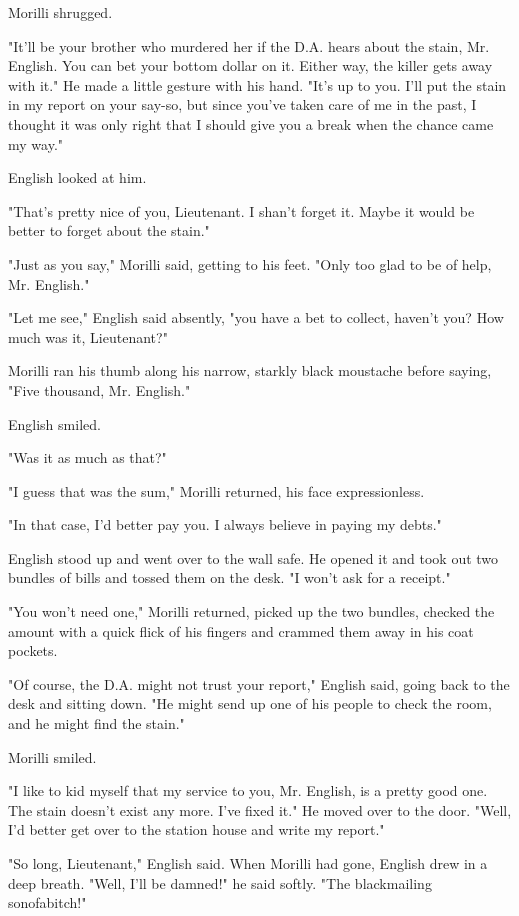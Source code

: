 \documentclass{novel}
\begin{document}
Morilli shrugged.

"It'll be your brother who murdered her if the D.A. hears about the stain, Mr. English. You can bet your bottom dollar on it. Either way, the killer gets away with it." He made a little gesture with his hand. "It's up to you. I'll put the stain in my report on your say-so, but since you've taken care of me in the past, I thought it was only right that I should give you a break when the chance came my way."

English looked at him.

"That's pretty nice of you, Lieutenant. I shan't forget it. Maybe it would be better to forget about the stain."

"Just as you say," Morilli said, getting to his feet. "Only too glad to be of help, Mr. English."

"Let me see," English said absently, "you have a bet to collect, haven't you? How much was it, Lieutenant?"

Morilli ran his thumb along his narrow, starkly black moustache before saying, "Five thousand, Mr. English."

English smiled.

"Was it as much as that?"

"I guess that was the sum," Morilli returned, his face expressionless.

"In that case, I'd better pay you. I always believe in paying my debts."

English stood up and went over to the wall safe. He opened it and took out two bundles of bills and tossed them on the desk. "I won't ask for a receipt."

"You won't need one," Morilli returned, picked up the two bundles, checked the amount with a quick flick of his fingers and crammed them away in his coat pockets.

"Of course, the D.A. might not trust your report," English said, going back to the desk and sitting down. "He might send up one of his people to check the room, and he might find the stain."

Morilli smiled.

"I like to kid myself that my service to you, Mr. English, is a pretty good one. The stain doesn't exist any more. I've fixed it." He moved over to the door. "Well, I'd better get over to the station house and write my report."

"So long, Lieutenant," English said. When Morilli had gone, English drew in a deep breath. "Well, I'll be damned!" he said softly. "The blackmailing sonofabitch!"
\end{document}
